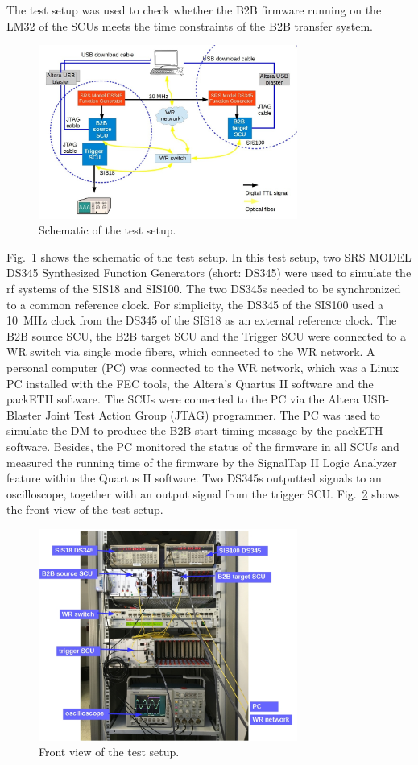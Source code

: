 The test setup was used to check whether the B2B firmware running on the LM32 of the SCUs meets the time constraints of the B2B transfer system.  

\begin{figure}[!htb]
   \centering   
   \includegraphics*[width=85mm]{schematic_setup.jpg}
   \caption{Schematic of the test setup.}
   \label{setup}
\end{figure}
Fig.~\ref{setup} shows the schematic of the test setup. In this test setup, two SRS MODEL DS345 Synthesized Function Generators (short: DS345) were used to simulate the rf systems of the SIS18 and SIS100. The two DS345s needed to be synchronized to a common reference clock. For simplicity, the DS345 of the SIS100 used a \SI{10}{\MHz} clock from the DS345 of the SIS18 as an external reference clock. The B2B source SCU, the B2B target SCU and the Trigger SCU were connected to a WR switch via single mode fibers, which connected to the WR network. A personal computer (PC) was connected to the WR network, which was a Linux PC installed with the FEC tools, the Altera's Quartus II software and the packETH software. The SCUs were connected to the PC via the Altera USB-Blaster Joint Test Action Group (JTAG) programmer. The PC was used to simulate the DM to produce the B2B start timing message by the packETH software. Besides, the PC monitored the status of the firmware in all SCUs and measured the running time of the firmware by the SignalTap II Logic Analyzer feature within the Quartus II software. Two DS345s outputted signals to an oscilloscope, together with an output signal from the trigger SCU. Fig.~\ref{testsetup_text} shows the front view of the test setup. 
\begin{figure}[!htb]
   \centering   
   \includegraphics*[width=85mm]{testsetup_text.jpg}
   \caption{Front view of the test setup.}
   \label{testsetup_text}
\end{figure}

